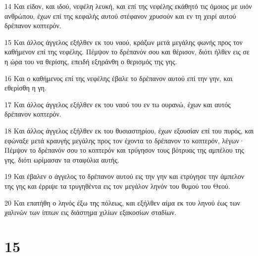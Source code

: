 \par 14 Και είδον, και ιδού, νεφέλη λευκή, και επί της νεφέλης εκάθητό τις όμοιος με υιόν ανθρώπου, έχων επί της κεφαλής αυτού στέφανον χρυσούν και εν τη χειρί αυτού δρέπανον κοπτερόν.
\par 15 Και άλλος άγγελος εξήλθεν εκ του ναού, κράζων μετά μεγάλης φωνής προς τον καθήμενον επί της νεφέλης. Πέμψον το δρέπανόν σου και θέρισον, διότι ήλθεν εις σε η ώρα του να θερίσης, επειδή εξηράνθη ο θερισμός της γης.
\par 16 Και ο καθήμενος επί της νεφέλης έβαλε το δρέπανον αυτού επί την γην, και εθερίσθη η γη.
\par 17 Και άλλος άγγελος εξήλθεν εκ του ναού του εν τω ουρανώ, έχων και αυτός δρέπανον κοπτερόν.
\par 18 Και άλλος άγγελος εξήλθεν εκ του θυσιαστηρίου, έχων εξουσίαν επί του πυρός, και εφώναξε μετά κραυγής μεγάλης προς τον έχοντα το δρέπανον το κοπτερόν, λέγων· Πέμψον το δρέπανόν σου το κοπτερόν και τρύγησον τους βότρυας της αμπέλου της γης, διότι ωρίμασαν τα σταφύλια αυτής.
\par 19 Και έβαλεν ο άγγελος το δρέπανον αυτού εις την γην και ετρύγησε την άμπελον της γης και έρριψε τα τρυγηθέντα εις τον μεγάλον ληνόν του θυμού του Θεού.
\par 20 Και επατήθη ο ληνός έξω της πόλεως, και εξήλθεν αίμα εκ του ληνού έως των χαλινών των ίππων εις διάστημα χιλίων εξακοσίων σταδίων.

\chapter{15}

